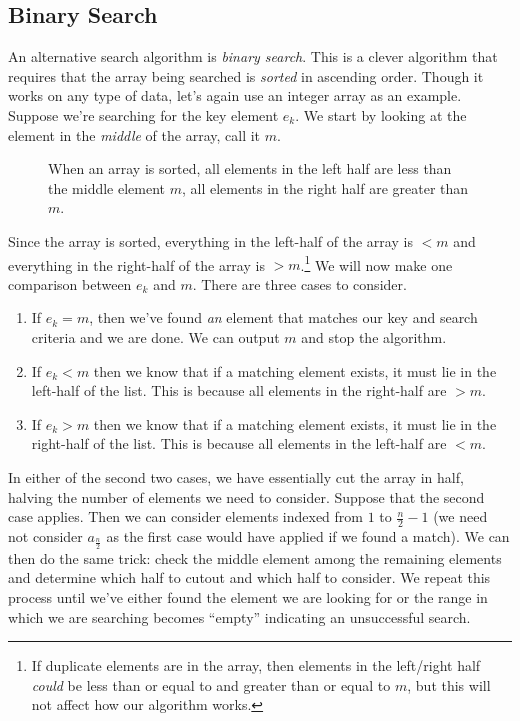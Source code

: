 \subsection{Binary Search}

An alternative search algorithm is \emph{binary search}.  This is a 
clever algorithm that requires that the array being searched is 
\emph{sorted} in ascending order.  Though it works on any type of
data, let's again use an integer array as an example.  Suppose
we're searching for the key element $e_k$.  We start by looking
at the element in the \emph{middle} of the array, call it $m$.

\begin{figure}
\centering

\caption[A Sorted Array]{When an array is sorted, all elements in the left half are less than the middle element $m$, all elements in the
right half are greater than $m$.}
\label{figure:binarySearchDemo}
\end{figure}

Since the array is sorted, everything in the left-half 
of the array is $< m$ and everything in the right-half of the array 
is $> m$.\footnote{If duplicate elements
are in the array, then elements in the left/right half \emph{could}
be less than or equal to and greater than or equal to $m$, but this
will not affect how our algorithm works.}  We will now make one 
comparison between $e_k$ and $m$. There are three cases to consider.
\begin{enumerate}
  \item If $e_k = m$, then we've found \emph{an} element that matches
  	our key and search criteria and we are done.  We can output
	$m$ and stop the algorithm.
  \item If $e_k < m$ then we know that if a matching element exists, 
  	it must lie in the left-half of the list.  This is because all 
	elements in the right-half are $> m$.
  \item If $e_k > m$ then we know that if a matching element exists, 
  	it must lie in the right-half of the list.  This is because all 
	elements in the left-half are $< m$.
\end{enumerate}

In either of the second two cases, we have essentially cut the array
in half, halving the number of elements we need to consider.  Suppose
that the second case applies.  Then we can consider elements indexed
from $1$ to $\frac{n}{2}-1$ (we need not consider $a_{\frac{n}{2}}$ 
as the first case would have applied if we found a match).  We
can then do the same trick: check the middle element among the 
remaining elements and determine which half to cutout and which
half to consider.  We repeat this process until we've either found
the element we are looking for or the range in which we are searching
becomes ``empty'' indicating an unsuccessful search.

